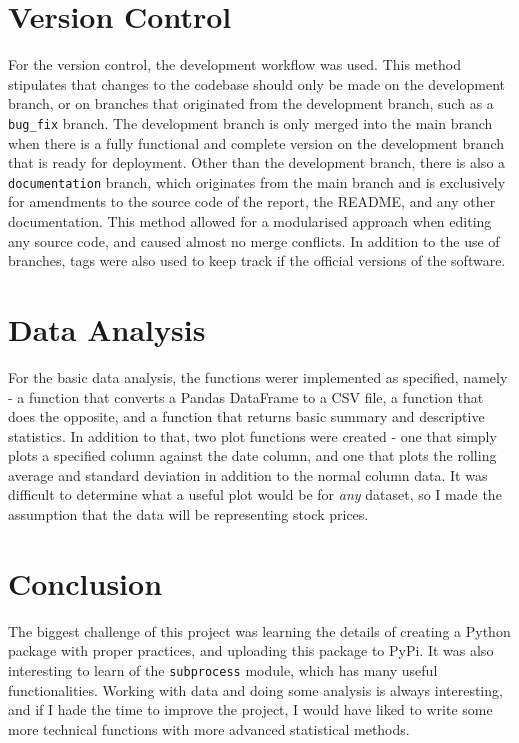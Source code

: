 \documentclass[12pt]{article}
\begin{document}
\section{Version Control}
For the version control, the development workflow was used. This method
stipulates that changes to the codebase should only be made on the development
branch, or on branches that originated from the development branch, such as a
\verb|bug_fix| branch. The development branch is only merged into the main
branch when there is a fully functional and complete version on the development
branch that is ready for deployment.\newline\newline
Other than the development branch, there is also a \verb|documentation| branch,
which originates from the main branch and is exclusively for amendments to the
source code of the report, the README, and any other
documentation.\newline\newline
This method allowed for a modularised approach when editing any source code, and
caused almost no merge conflicts. In addition to the use of branches, tags were
also used to keep track if the official versions of the software.

\section{Data Analysis}
For the basic data analysis, the functions werer implemented as specified,
namely - a function that converts a Pandas DataFrame to a CSV file, a function
that does the opposite, and a function that returns basic summary and
descriptive statistics.\newline\newline
In addition to that, two plot functions were created - one that simply plots
a specified column against the date column, and one that plots the rolling 
average and standard deviation in addition to the normal column data.\newline\newline
It was difficult to determine what a useful plot would be for \emph{any} dataset,
so I made the assumption that the data will be representing stock prices.

\section{Conclusion}
The biggest challenge of this project was learning the details of creating a
Python package with proper practices, and uploading this package to PyPi. It was
also interesting to learn of the \verb|subprocess| module, which has many useful
functionalities. Working with data and doing some analysis is always
interesting, and if I hade the time to improve the project, I would have liked
to write some more technical functions with more advanced statistical methods.
\end{document}

